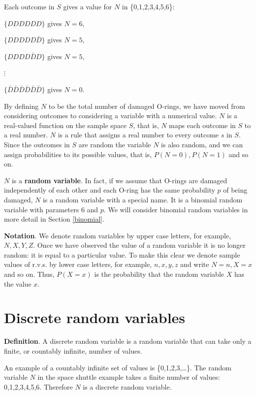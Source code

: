 \documentclass[
  11pt,
  british,
  openany, a4paper]{book}
\begin{document}
Each outcome in \(S\) gives a value for \(N\) in \{0,1,2,3,4,5,6\}:

\(\{DDDDDD\}\) gives \(N=6\),

\(\{DDDDD\bar{D}\}\) gives \(N=5\),

\(\{DDDD\bar{D}D\}\) gives \(N=5\),

\(\vdots\)

\(\{\bar{D}\bar{D}\bar{D}\bar{D}\bar{D}\bar{D}\}\) gives \(N=0\).

By defining \(N\) to be the total number of damaged O-rings, we have moved from considering outcomes to considering a variable with a numerical value. \(N\) is a real-valued function on the sample space \(S\), that is, \(N\) maps each outcome in \(S\) to a real number. \(N\) is a rule that assigns a real number to every outcome \(s\) in \(S\). Since the outcomes in \(S\) are random the variable \(N\) is also random, and we can assign probabilities to its possible values, that is, \(P(N=0), P(N=1)\) and so on.

\(N\) is a \textbf{random variable}. In fact, if we assume that O-rings are damaged independently of each other and each O-ring has the same probability \(p\) of being damaged, \(N\) is a random variable with a special name. It is a binomial random variable with parameters 6 and \(p\). We will consider binomial random variables in more detail in Section \ref{binomial}.

\textbf{Notation}. We denote random variables by upper case letters, for example, \(N, X, Y, Z\). Once we have observed the value of a random variable it is no longer random: it is equal to a particular value. To make this clear we denote sample values of r.v.s. by lower case letters, for example, \(n, x, y, z\) and write \(N=n, X=x\) and so on. Thus, \(P(X=x)\) is the probability that the random variable \(X\) has the value \(x\).

\hypertarget{discrete}{%
\section{Discrete random variables}\label{discrete}}

\textbf{Definition}. A discrete random variable is a random variable that can take only a finite, or countably infinite, number of values.

An example of a countably infinite set of values is \{0,1,2,3,\ldots\}. The random variable \(N\) in the space shuttle example takes a finite number of values: 0,1,2,3,4,5,6. Therefore \(N\) is a discrete random variable.
\end{document}
